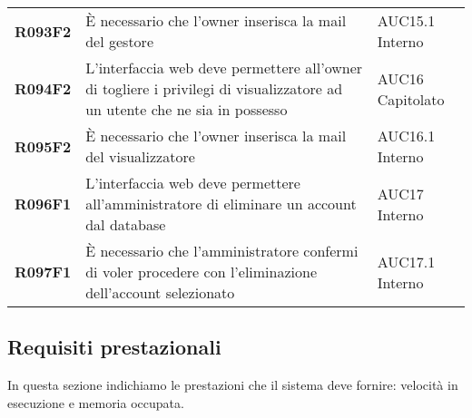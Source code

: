 \documentclass[../analisi-dei-requisiti.tex]{subfiles}
\begin{document}
\begin{longtable}[H]{>{\centering\bfseries}m{3cm} >{\centering}m{10cm} >{\centering\arraybackslash}m{3cm}}
  R093F2                               & È necessario che l'owner inserisca la mail del gestore                                                                                                                                                  & AUC15.1 Interno               \\
  R094F2                               & L'interfaccia web deve permettere all'owner di togliere i privilegi di visualizzatore ad un utente che ne sia in possesso                                                                               & AUC16 Capitolato              \\
  R095F2                               & È necessario che l'owner inserisca la mail del visualizzatore                                                                                                                                           & AUC16.1 Interno               \\
  R096F1                               & L'interfaccia web deve permettere all'amministratore di eliminare un account dal database                                                                                                               & AUC17 Interno                 \\
  R097F1                               & È necessario che l'amministratore confermi di voler procedere con l'eliminazione dell'account selezionato                                                                                               & AUC17.1 Interno               \\
\end{longtable}

\newpage
\subsection{Requisiti prestazionali}%
\label{sub:requisiti_prestazionali}
In questa sezione indichiamo le prestazioni che il sistema deve fornire: velocità in esecuzione e memoria occupata.
\end{document}
